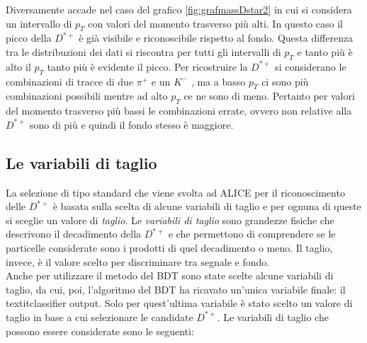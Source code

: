 Diversamente accade nel caso del grafico \ref{fig:grafmassDstar2} in cui si considera un intervallo di $p_T$ con valori del momento trasverso più alti. In questo caso il picco della $D^{*+}$ è già visibile e riconoscibile rispetto al fondo. 
Questa differenza tra le distribuzioni dei dati si riscontra per tutti gli intervalli di $p_T$ e tanto più è alto il $p_T$ tanto più è evidente il picco. Per ricostruire la $D^{*+}$ si considerano le combinazioni di tracce di due $\pi^+$ e un $K^-$ , ma a basso $p_T$ ci sono più combinazioni possibili mentre ad alto $p_T$ ce ne sono di meno. Pertanto per valori del momento trasverso più bassi le combinazioni errate, ovvero non relative alla $D^{*+}$ sono di più e quindi il fondo stesso è maggiore.

    \subsection{Le variabili di taglio}
    La selezione di tipo standard che viene svolta ad ALICE per il riconoscimento delle $D^{*+}$ è basata sulla scelta di alcune variabili di taglio e per ognuna di queste si sceglie un valore di \textit{taglio}. Le \textit{variabili di taglio} sono grandezze fisiche che descrivono il decadimento della $D^{*+}$ e che permettono di comprendere se le particelle considerate sono i prodotti di quel decadimento o meno. Il taglio, invece, è il valore scelto per discriminare tra segnale e fondo. 
    \\Anche per utilizzare il metodo del BDT sono state scelte alcune variabili di taglio, da cui, poi, l'algoritmo del BDT ha ricavato un'unica variabile finale: il textit{classifier output}. Solo per quest'ultima variabile è stato scelto un valore di taglio in base a cui selezionare le candidate $D^{*+}$. 
    Le variabili di taglio che possono essere considerate sono le seguenti:
